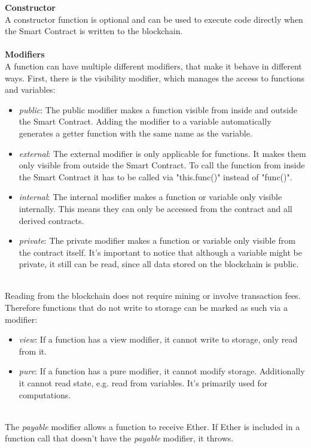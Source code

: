 \leavevmode
\textbf{Constructor}\\
A constructor function is optional and can be used to execute code directly when the Smart Contract is written to the blockchain\cite{doc-constructor}.
\\\\
\textbf{Modifiers}\\
A function can have multiple different modifiers, that make it behave in different ways\cite{doc-modifiers}.
First, there is the visibility modifier, which manages the access to functions and variables:
\begin{itemize}
  \item \textit{public}: The public modifier makes a function visible from inside and outside the Smart Contract. Adding the modifier to a variable automatically generates a getter function with the same name as the variable.
  \item \textit{external}: The external modifier is only applicable for functions. It makes them only visible from outside the Smart Contract. To call the function from inside the Smart Contract it has to be called via "this.func()" instead of "func()".
  \item \textit{internal}: The internal modifier makes a function or variable only visible internally. This means they can only be accessed from the contract and all derived contracts.
  \item \textit{private}: The private modifier makes a function or variable only visible from the contract itself. It's important to notice that although a variable might be private, it still can be read, since all data stored on the blockchain is public.
\end{itemize} 
\leavevmode
\\
Reading from the blockchain does not require mining or involve transaction fees. Therefore functions that do not write to storage can be marked as such via a modifier:
\begin{itemize}
  \item \textit{view}: If a function has a view modifier, it cannot write to storage, only read from it.
  \item \textit{pure}: If a function has a pure modifier, it cannot modify storage. Additionally it cannot read state, e.g. read from variables. It's primarily used for computations.
\end{itemize}
\leavevmode
\\
The \textit{payable} modifier allows a function to receive Ether. If Ether is included in a function call that doesn't have the \textit{payable} modifier, it throws.
